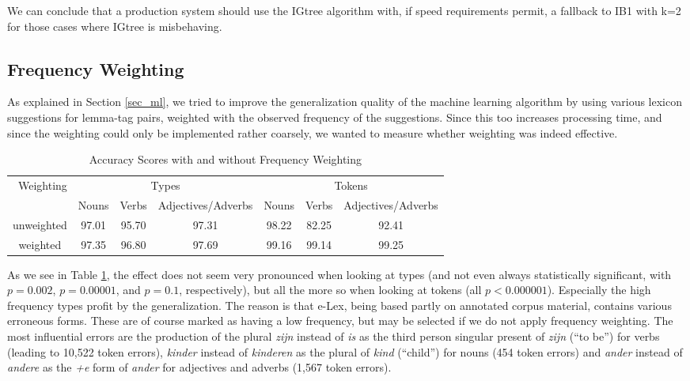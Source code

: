 \documentclass[a4paper,10pt,twoside]{article}
\begin{document}
We can conclude that a production system should use the IGtree algorithm with, if speed requirements permit, a fallback to IB1 with k=2 for those cases where IGtree is misbehaving.


\subsection{Frequency Weighting}
\label{sec_settings_weight}
As explained in Section \ref{sec_ml}, we tried to improve the generalization quality of the machine learning algorithm by using various lexicon suggestions for lemma-tag pairs, weighted with the observed frequency of the suggestions. Since this too increases processing time, and since the weighting could only be implemented rather coarsely, we wanted to measure whether weighting was indeed effective.


\begin{table}[tbh]
\begin{center}
\begin{tabular}{|c|ccc|ccc|}
\hline
 Weighting & \multicolumn{3}{|c|}{Types} & \multicolumn{3}{|c|}{Tokens} \\ 
& Nouns & Verbs & Adjectives/Adverbs & Nouns & Verbs & Adjectives/Adverbs \\ 
\hline

unweighted & 97.01 & 95.70 & 97.31 &  98.22 & 82.25 & 92.41\\
weighted & 97.35 & 96.80 & 97.69 & 99.16 & 99.14 & 99.25 \\
\hline
\end{tabular}
\caption{Accuracy Scores with and without Frequency Weighting}
\label{tab_results_weight}
\end{center}
\end{table}

As we see in Table \ref{tab_results_weight}, the effect does not seem very pronounced when looking at types (and not even always statistically significant, with $p=0.002$, $p=0.00001$, and $p=0.1$, respectively), but all the more so when looking at tokens (all $p<0.000001$). Especially the high frequency types profit by the generalization. The reason is that e-Lex, being based partly on annotated corpus material, contains various erroneous forms. These are of course marked as having a low frequency, but may be selected if we do not apply frequency weighting. The most influential errors are the production of the plural \textit{zijn} instead of \textit{is} as the third person singular present of \textit{zijn} (``to be'') for verbs (leading to 10,522 token errors), \textit{kinder} instead of \textit{kinderen} as the plural of \textit{kind} (``child'') for nouns (454 token errors) and \textit{ander} instead of \textit{andere} as the \textit{+e} form of \textit{ander} for adjectives and adverbs (1,567 token errors).
\end{document}
